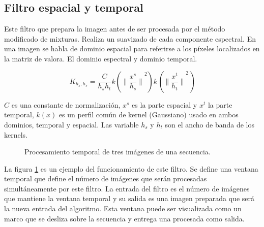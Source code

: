 \subsection{Filtro espacial y temporal}
Este filtro que prepara la imagen antes de ser procesada por el método modificado de mixturas. Realiza un suavizado de cada componente espectral. En una imagen se habla de dominio espacial para referirse a los píxeles localizados en la matriz de valora. El dominio espectral y dominio temporal.

\begin{equation} \label{eq:sagmm_filter}
K_{h_s,h_s} = \frac{C}{h_s h_t} k \left( {\| \frac{x^s}{h_s} \|}^2 \right) k \left( {\| \frac{x^t}{h_t} \|}^2 \right)
\end{equation}

$C$ es una constante de normalización, $x^s$ es la parte espacial y $x^t$ la parte temporal, $k(x)$ es un perfil común de kernel (Gaussiano) usado en ambos dominios, temporal y espacial. Las variable $h_s$ y $h_t$ son el ancho de banda de los kernels. 


\begin{figure}[h!]
\centering
{}
\caption[Procesamiento temporal de tres imágenes]{Procesamiento temporal de tres imágenes de una secuencia.}
\label{fig:spatio_temporal_filter_example}
\end{figure}


La figura \ref{fig:spatio_temporal_filter_example} es un ejemplo del funcionamiento de este filtro. Se define una ventana temporal que define el número de imágenes que serán procesadas simultáneamente por este filtro. La entrada del filtro es el número de imágenes que mantiene la ventana temporal y su salida es una imagen preparada que será la nueva entrada del algoritmo. Esta ventana puede ser visualizada como un marco que se desliza sobre la secuencia y entrega una procesada como salida.

